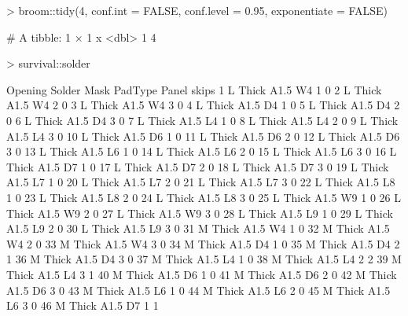\documentclass{article}
\begin{document}
\begin{Schunk}
\begin{Sinput}
> broom::tidy(4, conf.int = FALSE, conf.level = 0.95, exponentiate = FALSE)
\end{Sinput}
\begin{Soutput}
# A tibble: 1 × 1
      x
  <dbl>
1     4
\end{Soutput}
\begin{Sinput}
> survival::solder
\end{Sinput}
\begin{Soutput}
    Opening Solder Mask PadType Panel skips
1         L  Thick A1.5      W4     1     0
2         L  Thick A1.5      W4     2     0
3         L  Thick A1.5      W4     3     0
4         L  Thick A1.5      D4     1     0
5         L  Thick A1.5      D4     2     0
6         L  Thick A1.5      D4     3     0
7         L  Thick A1.5      L4     1     0
8         L  Thick A1.5      L4     2     0
9         L  Thick A1.5      L4     3     0
10        L  Thick A1.5      D6     1     0
11        L  Thick A1.5      D6     2     0
12        L  Thick A1.5      D6     3     0
13        L  Thick A1.5      L6     1     0
14        L  Thick A1.5      L6     2     0
15        L  Thick A1.5      L6     3     0
16        L  Thick A1.5      D7     1     0
17        L  Thick A1.5      D7     2     0
18        L  Thick A1.5      D7     3     0
19        L  Thick A1.5      L7     1     0
20        L  Thick A1.5      L7     2     0
21        L  Thick A1.5      L7     3     0
22        L  Thick A1.5      L8     1     0
23        L  Thick A1.5      L8     2     0
24        L  Thick A1.5      L8     3     0
25        L  Thick A1.5      W9     1     0
26        L  Thick A1.5      W9     2     0
27        L  Thick A1.5      W9     3     0
28        L  Thick A1.5      L9     1     0
29        L  Thick A1.5      L9     2     0
30        L  Thick A1.5      L9     3     0
31        M  Thick A1.5      W4     1     0
32        M  Thick A1.5      W4     2     0
33        M  Thick A1.5      W4     3     0
34        M  Thick A1.5      D4     1     0
35        M  Thick A1.5      D4     2     1
36        M  Thick A1.5      D4     3     0
37        M  Thick A1.5      L4     1     0
38        M  Thick A1.5      L4     2     2
39        M  Thick A1.5      L4     3     1
40        M  Thick A1.5      D6     1     0
41        M  Thick A1.5      D6     2     0
42        M  Thick A1.5      D6     3     0
43        M  Thick A1.5      L6     1     0
44        M  Thick A1.5      L6     2     0
45        M  Thick A1.5      L6     3     0
46        M  Thick A1.5      D7     1     1

\end{Soutput}
\end{Schunk}
\end{document}
